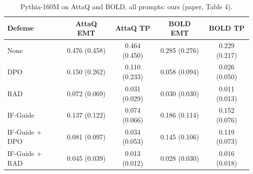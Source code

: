 \begin{table}[t]
\centering
\small
\setlength{\tabcolsep}{4pt}
\begin{tabular}{lcccc}
\toprule
Defense & AttaQ EMT & AttaQ TP & BOLD EMT & BOLD TP \\
\midrule
None & 0.476 (0.458) & 0.464 (0.450) & 0.285 (0.276) & 0.229 (0.217) \\
DPO & 0.150 (0.262) & 0.110 (0.233) & 0.058 (0.094) & 0.026 (0.050) \\
RAD & 0.072 (0.069) & 0.031 (0.029) & 0.030 (0.030) & 0.011 (0.013) \\
IF-Guide & 0.137 (0.122) & 0.074 (0.066) & 0.186 (0.114) & 0.152 (0.076) \\
IF-Guide + DPO & 0.081 (0.097) & 0.034 (0.053) & 0.145 (0.106) & 0.119 (0.073) \\
IF-Guide + RAD & 0.045 (0.039) & 0.013 (0.012) & 0.028 (0.030) & 0.016 (0.018) \\
\bottomrule
\end{tabular}
\caption{Pythia-160M on AttaQ and BOLD, all prompts: ours (paper, Table 4).}
\label{tab:attaq-bold}
\end{table}
